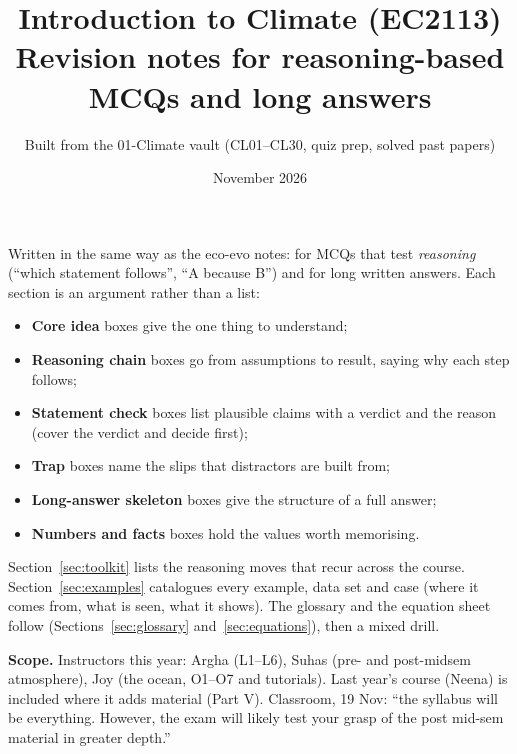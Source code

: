\documentclass[11pt,a4paper]{article}
\title{\Huge\bfseries Introduction to Climate (EC2113)\\[4pt]
\Large Revision notes for reasoning-based MCQs and long answers}
\author{Built from the 01-Climate vault (CL01--CL30, quiz prep, solved past papers)}
\date{November 2026}
\begin{document}
\maketitle
\thispagestyle{empty}

\begin{tcolorbox}[colback=NavyBlue!4,colframe=NavyBlue!70!black,title={How to use these notes}]
Written in the same way as the eco-evo notes: for MCQs that test \emph{reasoning} (``which statement follows'',
``A because B'') and for long written answers. Each section is an argument rather than a list:
\begin{itemize}
\item \textbf{Core idea} boxes give the one thing to understand;
\item \textbf{Reasoning chain} boxes go from assumptions to result, saying why each step follows;
\item \textbf{Statement check} boxes list plausible claims with a verdict and the reason (cover the verdict and decide first);
\item \textbf{Trap} boxes name the slips that distractors are built from;
\item \textbf{Long-answer skeleton} boxes give the structure of a full answer;
\item \textbf{Numbers and facts} boxes hold the values worth memorising.
\end{itemize}
Section~\ref{sec:toolkit} lists the reasoning moves that recur across the course. Section~\ref{sec:examples} catalogues every
example, data set and case (where it comes from, what is seen, what it shows). The glossary and the equation sheet follow
(Sections~\ref{sec:glossary} and~\ref{sec:equations}), then a mixed drill.

\textbf{Scope.} Instructors this year: Argha (L1--L6), Suhas (pre- and post-midsem atmosphere), Joy (the ocean, O1--O7 and
tutorials). Last year's course (Neena) is included where it adds material (Part V). Classroom, 19 Nov: ``the syllabus will be
everything. However, the exam will likely test your grasp of the post mid-sem material in greater depth.''
\end{tcolorbox}

\tableofcontents
\newpage





















\end{document}
